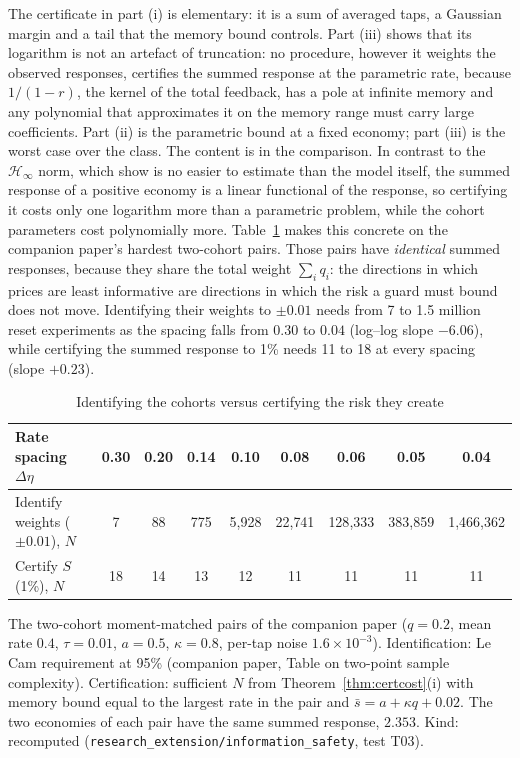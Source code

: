 The certificate in part (i) is elementary: it is a sum of averaged taps, a Gaussian margin and a tail that the memory bound controls. Part (iii) shows that its logarithm is not an artefact of truncation: no procedure, however it weights the observed responses, certifies the summed response at the parametric rate, because $1/(1-r)$, the kernel of the total feedback, has a pole at infinite memory and any polynomial that approximates it on the memory range must carry large coefficients. Part (ii) is the parametric bound at a fixed economy; part (iii) is the worst case over the class. The content is in the comparison. In contrast to the $\mathcal H_\infty$ norm, which \citet{tu2018} show is no easier to estimate than the model itself, the summed response of a positive economy is a linear functional of the response, so certifying it costs only one logarithm more than a parametric problem, while the cohort parameters cost polynomially more. Table~\ref{tab:certvsid} makes this concrete on the companion paper's hardest two-cohort pairs. Those pairs have \emph{identical} summed responses, because they share the total weight $\sum_iq_i$: the directions in which prices are least informative are directions in which the risk a guard must bound does not move. Identifying their weights to $\pm0.01$ needs from 7 to 1.5 million reset experiments as the spacing falls from $0.30$ to $0.04$ (log--log slope $-6.06$), while certifying the summed response to 1\% needs 11 to 18 at every spacing (slope $+0.23$).

\begin{table}[t]\centering\small
\begin{threeparttable}
\caption{Identifying the cohorts versus certifying the risk they create}\label{tab:certvsid}
\begin{tabular}{lcccccccc}
\toprule
Rate spacing $\Delta\eta$ & 0.30 & 0.20 & 0.14 & 0.10 & 0.08 & 0.06 & 0.05 & 0.04\\
\midrule
Identify weights ($\pm0.01$), $N$ & 7 & 88 & 775 & 5{,}928 & 22{,}741 & 128{,}333 & 383{,}859 & 1{,}466{,}362\\
Certify $S$ (1\%), $N$ & 18 & 14 & 13 & 12 & 11 & 11 & 11 & 11\\
\bottomrule
\end{tabular}
\begin{tablenotes}\footnotesize\item The two-cohort moment-matched pairs of the companion paper ($q=0.2$, mean rate $0.4$, $\tau=0.01$, $a=0.5$, $\kappa=0.8$, per-tap noise $1.6\times10^{-3}$). Identification: Le Cam requirement at 95\% (companion paper, Table on two-point sample complexity). Certification: sufficient $N$ from Theorem~\ref{thm:certcost}(i) with memory bound equal to the largest rate in the pair and $\bar s=a+\kappa q+0.02$. The two economies of each pair have the same summed response, $2.353$. Kind: recomputed (\texttt{research\_extension/information\_safety}, test T03).\end{tablenotes}
\end{threeparttable}
\end{table}

